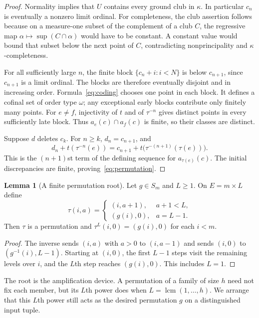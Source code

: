 \documentclass[11pt,letterpaper]{article}
\theoremstyle{definition}
\newtheorem{lemma}[definition]{Lemma}
\numberwithin{equation}{section}
\newcommand{\lcm}{\operatorname{lcm}}
\begin{document}
\begin{proof}
Normality implies that $U$ contains every ground club in $\kappa$. In
particular $c_n$ is eventually a nonzero limit ordinal. For completeness,
the club assertion follows because on a measure-one subset of the
complement of a club $C$, the regressive map
$\alpha\mapsto\sup(C\cap\alpha)$ would have to be constant. A constant
value would bound that subset below the next point of $C$, contradicting
nonprincipality and $\kappa$-completeness.

For all sufficiently large $n$, the finite block
$\{c_n+i:i<N\}$ is below $c_{n+1}$, since $c_{n+1}$ is a limit ordinal.
The blocks are therefore eventually disjoint and in increasing order.
Formula~\eqref{eq:coding} chooses one point in each block. It defines a
cofinal set of order type $\omega$; any exceptional early blocks contribute
only finitely many points. For $e\ne f$, injectivity of $t$ and of
$\tau^{-n}$ gives distinct points in every sufficiently late block.
Thus $a_e(c)\cap a_f(c)$ is finite, so their classes are distinct.

Suppose $d$ deletes $c_k$. For $n\ge k$, $d_n=c_{n+1}$, and
\[
 d_n+t(\tau^{-n}(e))
 =c_{n+1}+t\bigl(\tau^{-(n+1)}(\tau(e))\bigr).
\]
This is the $(n+1)$st term of the defining sequence for $a_{\tau(e)}(c)$.
The initial discrepancies are finite, proving~\eqref{eq:permutation}.
\end{proof}

\begin{lemma}[A finite permutation root]\label{lem:root}
Let $g\in S_m$ and $L\ge1$. On $E=m\times L$ define
\begin{equation}\label{eq:root}
 \tau(i,a)=
 \begin{cases}
  (i,a+1),&a+1<L,\\
  (g(i),0),&a=L-1.
 \end{cases}
\end{equation}
Then $\tau$ is a permutation and
$\tau^L(i,0)=(g(i),0)$ for each $i<m$.
\end{lemma}

\begin{proof}
The inverse sends $(i,a)$ with $a>0$ to $(i,a-1)$ and sends $(i,0)$ to
$(g^{-1}(i),L-1)$. Starting at $(i,0)$, the first $L-1$ steps visit the
remaining levels over $i$, and the $L$th step reaches $(g(i),0)$.
This includes $L=1$.
\end{proof}

The root is the amplification device. A permutation of a family of size
$h$ need not fix each member, but its $L$th power does when
$L=\lcm(1,\ldots,h)$. We arrange that this $L$th power still acts as the
desired permutation $g$ on a distinguished input tuple.
\end{document}
